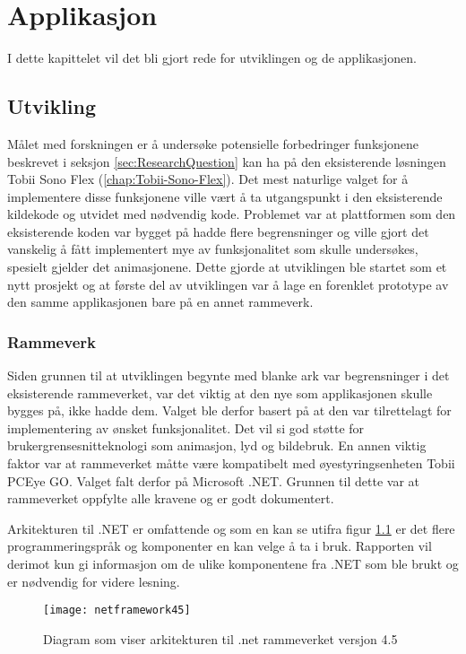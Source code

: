 
\chapter{Applikasjon}

I dette kapittelet vil det bli gjort rede for utviklingen og de applikasjonen.


\section{Utvikling}


Målet med forskningen er å undersøke potensielle forbedringer funksjonene beskrevet i seksjon \ref{sec:ResearchQuestion} kan ha på den eksisterende løsningen Tobii Sono Flex (\ref{chap:Tobii-Sono-Flex}). Det mest naturlige valget for å implementere disse funksjonene ville vært å ta utgangspunkt i den eksisterende kildekode og utvidet med nødvendig kode. Problemet var at plattformen som den eksisterende koden var bygget på hadde flere begrensninger og ville gjort det vanskelig å fått implementert mye av funksjonalitet som skulle undersøkes, spesielt gjelder det animasjonene. Dette gjorde at utviklingen ble startet som et nytt prosjekt og at første del av utviklingen var å lage en forenklet prototype av den samme applikasjonen bare på en annet rammeverk.

\subsection{Rammeverk}

Siden grunnen til at utviklingen begynte med blanke ark var begrensninger i det eksisterende rammeverket, var det viktig at den nye som applikasjonen skulle bygges på, ikke hadde dem. Valget ble derfor basert på at den var tilrettelagt for implementering av ønsket funksjonalitet. Det vil si god støtte for brukergrensesnitteknologi som animasjon, lyd og bildebruk. En annen viktig faktor var at rammeverket måtte være kompatibelt med øyestyringsenheten Tobii PCEye GO.
Valget falt derfor på Microsoft .NET. Grunnen til dette var at rammeverket oppfylte alle kravene og er godt dokumentert.


Arkitekturen til .NET er omfattende og som en kan se utifra figur \ref{fig:net-arkitektur} er det flere programmeringspråk og komponenter en kan velge å ta i bruk. Rapporten vil derimot kun gi informasjon om de ulike komponentene fra .NET som ble brukt og er nødvendig for videre lesning.


\begin{figure}[ht]
\centering
\texttt{[image: netframework45]}
\caption{Diagram som viser arkitekturen til .net rammeverket versjon 4.5}
\label{fig:net-arkitektur}
\end{figure}

